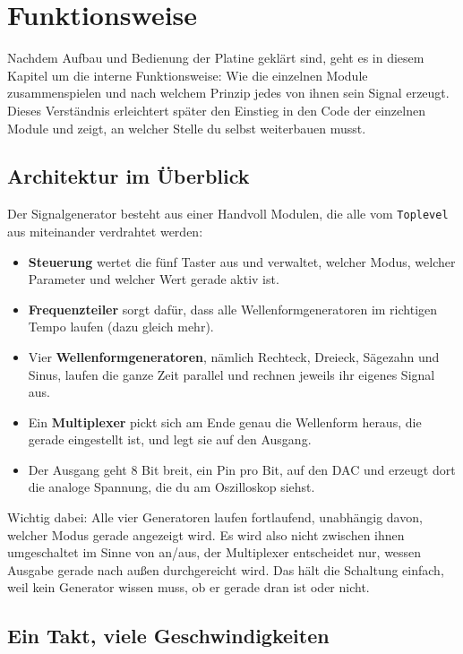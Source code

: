 \chapter{Funktionsweise}
\label{ch:funktionsweise}

Nachdem Aufbau und Bedienung der Platine geklärt sind, geht es in diesem Kapitel um die interne Funktionsweise: Wie die einzelnen Module zusammenspielen und nach welchem Prinzip jedes von ihnen sein Signal erzeugt. Dieses Verständnis erleichtert später den Einstieg in den Code der einzelnen Module und zeigt, an welcher Stelle du selbst weiterbauen musst.

\section{Architektur im Überblick}

Der Signalgenerator besteht aus einer Handvoll Modulen, die alle vom \texttt{Toplevel} aus miteinander verdrahtet werden:

\begin{itemize}
    \item \textbf{Steuerung} wertet die fünf Taster aus und verwaltet, welcher Modus, welcher Parameter und welcher Wert gerade aktiv ist.
    \item \textbf{Frequenzteiler} sorgt dafür, dass alle Wellenformgeneratoren im richtigen Tempo laufen (dazu gleich mehr).
    \item Vier \textbf{Wellenformgeneratoren}, nämlich Rechteck, Dreieck, Sägezahn und Sinus, laufen die ganze Zeit parallel und rechnen jeweils ihr eigenes Signal aus.
    \item Ein \textbf{Multiplexer} pickt sich am Ende genau die Wellenform heraus, die gerade eingestellt ist, und legt sie auf den Ausgang.
    \item Der Ausgang geht 8 Bit breit, ein Pin pro Bit, auf den DAC und erzeugt dort die analoge Spannung, die du am Oszilloskop siehst.
\end{itemize}

Wichtig dabei: Alle vier Generatoren laufen fortlaufend, unabhängig davon, welcher Modus gerade angezeigt wird. Es wird also nicht zwischen ihnen \glqq umgeschaltet\grqq{} im Sinne von an/aus, der Multiplexer entscheidet nur, wessen Ausgabe gerade nach außen durchgereicht wird. Das hält die Schaltung einfach, weil kein Generator wissen muss, ob er gerade \glqq dran\grqq{} ist oder nicht.

\section{Ein Takt, viele Geschwindigkeiten}

